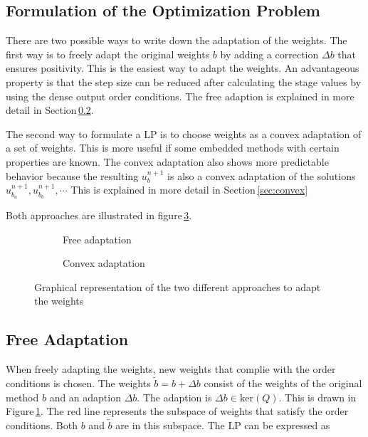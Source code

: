 \documentclass[a4paper]{article}
\numberwithin{equation}{section}
\theoremstyle{plain}
\theoremstyle{definition}
\numberwithin{theorem}{section}
\newcommand{\1}{\mathbbm{1}}
\begin{document}
\subsection{Formulation of the Optimization Problem}

There are two possible ways to write down the adaptation of the weights. The first way is to freely adapt the original weights $b$ by adding a correction $\Delta b$ that ensures positivity.
This is the easiest way to adapt the weights. An advantageous property is that the step size can be reduced after calculating the stage values by using the dense output order conditions.  
The free adaption is explained in more detail in Section\,\ref{sec:direct}.

The second way to formulate a LP is to choose weights as a convex adaptation of a set of weights. This is more useful if some embedded methods with certain properties are known. 
The convex adaptation also shows more predictable behavior because the resulting $u^{n+1}_b$ is also a convex adaptation of the solutions $u^{n+1}_{b_a},u^{n+1}_{b_b},\cdots$ 
This is explained in more detail in Section\,\ref{sec:convex}

Both approaches are illustrated in figure\,\ref{fig:b_space}.


\begin{figure}
    \centering
    \begin{subfigure}[b]{0.45\textwidth}
        
        \caption{Free adaptation}
        \label{fig:b_direct}
    \end{subfigure}
    \begin{subfigure}[b]{0.45\textwidth}
        
        \caption{Convex adaptation}
        \label{fig:b_convex}
    \end{subfigure}
    \caption{Graphical representation of the two different approaches to adapt the weights}\label{fig:b_space}
\end{figure}

\subsection{Free Adaptation}\label{sec:direct}

When freely adapting the weights, new weights that complie with the order conditions is chosen.   
The weights $\tilde{b} = b + \Delta b$ consist of the weights of the original method $b$ and an adaption $\Delta b$. The adaption is $\Delta b \in \mathrm{ker}(Q)$. 
This is drawn in Figure\,\ref{fig:b_direct}. The red line represents the subspace of weights that satisfy the order conditions. Both $b$ and $\tilde{b}$ are in this subspace. 
The LP can be expressed as
\end{document}
